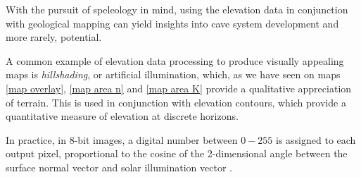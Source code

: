With the pursuit of speleology in mind, using the elevation data in conjunction with geological mapping can yield insights into cave system development and more rarely, potential. 

A common example of elevation data processing to produce visually appealing maps is \emph{hillshading}, or artificial illumination, which, as we have seen on maps \ref{map overlay}, \ref{map area n} and \ref{map area K} provide a qualitative appreciation of terrain. This is used in conjunction with elevation contours, which provide a quantitative measure of elevation at discrete horizons. 

In practice, in 8-bit images, a digital number between $0-255$ is assigned to each output pixel, proportional to the cosine of the 2-dimensional angle between the surface normal vector and solar illumination vector \citep{corripio2003vectorial}.






